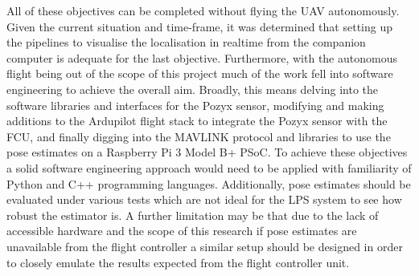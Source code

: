 All of these objectives can be completed without flying the UAV autonomously.
Given the current situation and time-frame, it was determined that setting up the pipelines to visualise the localisation in realtime from the companion computer is adequate for the last objective.
Furthermore, with the autonomous flight being out of the scope of this project much of the work fell into software engineering to achieve the overall aim.
Broadly, this means delving into the software libraries and interfaces for the Pozyx sensor, modifying and making additions to the Ardupilot flight stack to integrate the Pozyx sensor with the FCU,
and finally digging into the MAVLINK protocol and libraries to use the pose estimates on a Raspberry Pi 3 Model B+ PSoC.
To achieve these objectives a solid software engineering approach would need to be applied with familiarity of Python and C++ programming languages.
Additionally, pose estimates should be evaluated under various tests which are not ideal for the LPS system to see how robust the estimator is.
A further limitation may be that due to the lack of accessible hardware and the scope of this research if pose estimates are unavailable from the flight controller a similar setup should be designed in order to closely emulate the results expected from the flight controller unit.

